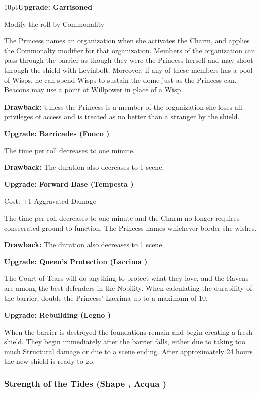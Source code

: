 \begin{myindentpar}{10pt}\textbf{Upgrade: Garrisoned}

Modify the roll by Commonality

The Princess names an organization when she activates the Charm, and applies the Commonalty modifier for that organization. Members of the organization can pass through the barrier as though they were the Princess herself and may shoot through the shield with Levinbolt. Moreover, if any of these members has a pool of Wisps, he can spend Wisps to sustain the dome just as the Princess can. Beacons may use a point of Willpower in place of a Wisp. 

\textbf{Drawback:} Unless the Princess is a member of the organization she loses all privileges of access and is treated as no better than a stranger by the shield.

\textbf{Upgrade: Barricades (Fuoco \textbullet\textbullet\textbullet)}

The time per roll decreases to one minute. 

\textbf{Drawback:} The duration also decreases to 1 scene. 

\textbf{Upgrade: Forward Base (Tempesta \textbullet\textbullet)}

Cost: +1 Aggravated Damage

The time per roll decreases to one minute and the Charm no longer requires consecrated ground to function. The Princess names whichever border she wishes.

\textbf{Drawback:} The duration also decreases to 1 scene. 

\textbf{Upgrade: Queen's Protection (Lacrima \textbullet)}

The Court of Tears will do anything to protect what they love, and the Ravens are among the best defenders in the Nobility. When calculating the durability of the barrier, double the Princess' Lacrima up to a maximum of 10. 

\textbf{Upgrade: Rebuilding (Legno \textbullet\textbullet\textbullet)}

When the barrier is destroyed the foundations remain and begin creating a fresh shield. They begin immediately after the barrier falls, either due to taking too much Structural damage or due to a scene ending. After approximately 24 hours the new shield is ready to go. 

\end{myindentpar}

\subsubsection*{Strength of the Tides (Shape \textbullet\textbullet\textbullet, Acqua \textbullet\textbullet)}

